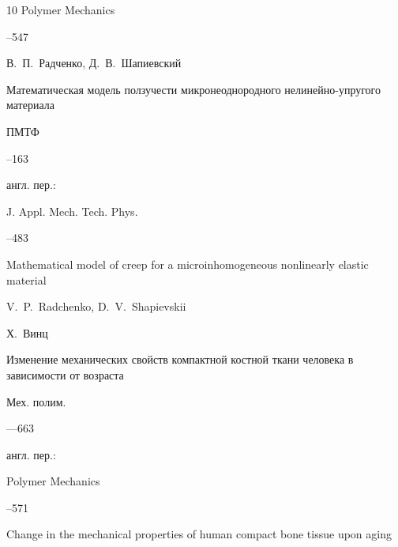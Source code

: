 \begin{thebibliography}{10}
\jour Polymer Mechanics



--547 









\by В.~П.~Радченко, Д.~В.~Шапиевский

\paper Математическая модель ползучести микронеоднородного нелинейно-упругого материала

\jour ПМТФ




--163

\transl англ. пер.:~

\jour J. Appl. Mech. Tech. Phys.




--483

\paper Mathematical model of creep for a microinhomogeneous nonlinearly elastic material

\by V.~P.~Radchenko, D.~V.~Shapievskii 





\by Х.~Винц

\paper Изменение механических свойств компактной костной ткани человека в зависимости от возраста

\jour Мех. полим.



---663

\transl англ. пер.:~

\jour Polymer Mechanics




--571

\paper Change in the mechanical properties of human compact bone tissue upon aging


\end{thebibliography}
